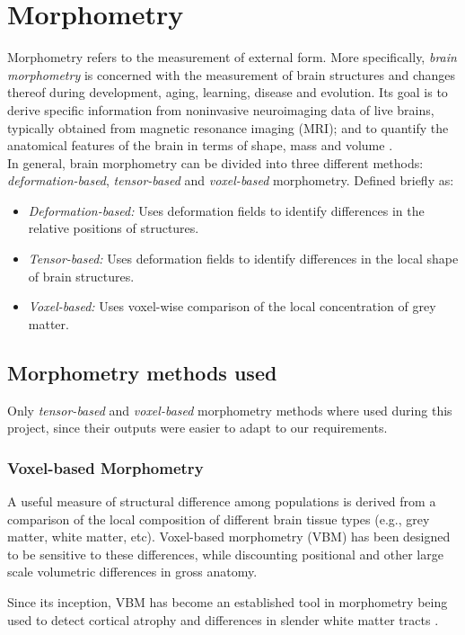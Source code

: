 \section{Morphometry}
Morphometry refers to the measurement of external form. More
specifically, \textit{brain morphometry} is concerned with the
measurement of brain structures and changes thereof during
development, aging, learning, disease and evolution. Its goal is to
derive specific information from noninvasive neuroimaging data of live
brains, typically obtained from magnetic resonance imaging (MRI); and
to quantify the anatomical features of the brain in terms of shape,
mass and volume \cite{brmorph}.\\

In general, brain morphometry can be divided into three different methods: \textit{deformation-based}, \textit{tensor-based} and \textit{voxel-based} morphometry. Defined briefly as:
\begin{itemize}
\item \textit{Deformation-based:} Uses deformation fields to identify differences in the relative positions of structures.
\item \textit{Tensor-based:} Uses deformation fields to identify differences in the local shape of brain structures.
\item \textit{Voxel-based:} Uses voxel-wise comparison of the local concentration of grey matter.
\end{itemize}


\subsection{Morphometry methods used}
\label{sec:morph_methods}
Only \textit{tensor-based} and \textit{voxel-based} morphometry
methods where used during this project, since their outputs were
easier to adapt to our requirements.


\subsubsection{Voxel-based Morphometry}
A useful measure of structural difference among populations is derived
from a comparison of the local composition of different brain tissue
types (e.g., grey matter, white matter, etc). Voxel-based morphometry
(VBM) has been designed to be sensitive to these differences, while
discounting positional and other large scale volumetric differences in
gross anatomy.

Since its inception, VBM has become an established tool in morphometry
being used to detect cortical atrophy and differences in slender white
matter tracts \cite{ashburner}.\\

